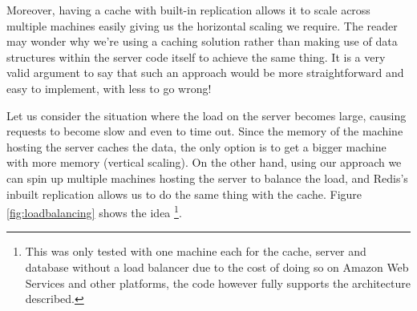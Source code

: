 Moreover, having a cache with built-in replication allows it to scale across multiple machines easily giving us the horizontal scaling we require. The reader may wonder why we're using a caching solution rather than making use of data structures within the server code itself to achieve the same thing. It is a very valid argument to say that such an approach would be more straightforward and easy to implement, with less to go wrong!

Let us consider the situation where the load on the server becomes large, causing requests to become slow and even to time out. Since the memory of the machine hosting the server caches the data, the only option is to get a bigger machine with more memory (vertical scaling). On the other hand, using our approach we can spin up multiple machines hosting the server to balance the load, and Redis's inbuilt replication allows us to do the same thing with the cache. Figure \ref{fig:loadbalancing} shows the idea \footnote{This was only tested with one machine each for the cache, server and database without a load balancer due to the cost of doing so on Amazon Web Services and other platforms, the code however fully supports the architecture described.}.












